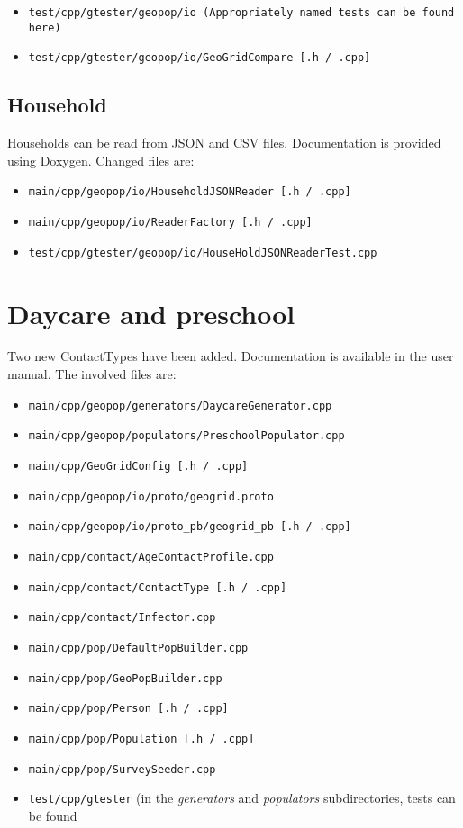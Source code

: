 \documentclass{article}
\begin{document}
\begin{itemize}
\item \texttt{test/cpp/gtester/geopop/io (Appropriately named tests can be found here)}
\item \texttt{test/cpp/gtester/geopop/io/GeoGridCompare [.h / .cpp]}
\end{itemize}

\subsection{Household}
Households can be read from JSON and CSV files. Documentation is provided using Doxygen.
Changed files are:

\begin{itemize}
\item \texttt{main/cpp/geopop/io/HouseholdJSONReader [.h / .cpp]}
\item \texttt{main/cpp/geopop/io/ReaderFactory [.h / .cpp]}
\item \texttt{test/cpp/gtester/geopop/io/HouseHoldJSONReaderTest.cpp}
\end{itemize}


\section{Daycare and preschool}
Two new ContactTypes have been added. Documentation is available in the user manual. The involved files  are:

\begin{itemize}
\item \texttt{main/cpp/geopop/generators/DaycareGenerator.cpp}
\item \texttt{main/cpp/geopop/populators/PreschoolPopulator.cpp}
\item \texttt{main/cpp/GeoGridConfig [.h / .cpp]}
\item \texttt{main/cpp/geopop/io/proto/geogrid.proto}
\item \texttt{main/cpp/geopop/io/proto\_pb/geogrid\_pb [.h / .cpp]}
\item \texttt{main/cpp/contact/AgeContactProfile.cpp}
\item \texttt{main/cpp/contact/ContactType [.h / .cpp]}
\item \texttt{main/cpp/contact/Infector.cpp}
\item \texttt{main/cpp/pop/DefaultPopBuilder.cpp}
\item \texttt{main/cpp/pop/GeoPopBuilder.cpp}
\item \texttt{main/cpp/pop/Person [.h / .cpp]}
\item \texttt{main/cpp/pop/Population [.h / .cpp]}
\item \texttt{main/cpp/pop/SurveySeeder.cpp}
\item \texttt{test/cpp/gtester} (in the \emph{generators} and \emph{populators} subdirectories, tests can be found
\end{itemize}
\end{document}
